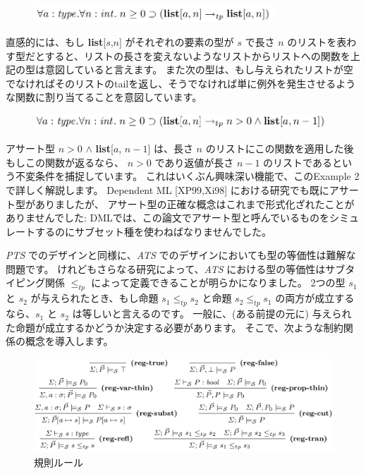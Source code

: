 \documentclass[submit,techreq,noauthor,onecolumn]{ipsj}
\begin{document}
\begin{figure}[h]
\centering
\includegraphics[width=9cm]{img/infig21_example1_list1.png}
\end{figure}

\noindent 直感的には、もし {\bf list}[$s$,$n$] がそれぞれの要素の型が $s$ で長さ $n$ のリストを表わす型だとすると、リストの長さを変えないようなリストからリストへの関数を上記の型は意図していると言えます。
また次の型は、もし与えられたリストが空でなければそのリストのtailを返し、そうでなければ単に例外を発生させるような関数に割り当てることを意図しています。

\begin{figure}[h]
\centering
\includegraphics[width=11cm]{img/infig21_example1_list2.png}
\end{figure}

アサート型 $n > 0$ $\wedge$ {\bf list}[$a$, $n-1$] は、長さ $n$ のリストにこの関数を適用した後もしこの関数が返るなら、 $n > 0$ であり返値が長さ $n-1$ のリストであるという不変条件を捕捉しています。
これはいくぶん興味深い機能で、このExample 2で詳しく解説します。
Dependent ML [XP99,Xi98] における研究でも既にアサート型がありましたが、
アサート型の正確な概念はこれまで形式化ざれたことがありませんでした:
DMLでは、この論文でアサート型と呼んでいるものをシミュレートするのにサブセット種を使わねばなりませんでした。

{\it PTS} でのデザインと同様に、{\it ATS} でのデザインにおいても型の等価性は難解な問題です。
けれどもさらなる研究によって、{\it ATS} における型の等価性はサブタイピング関係 $\leq_{tp}$ によって定義できることが明らかになりました。
2つの型 $s_1$ と $s_2$ が与えられたとき、もし命題 $s_1 \leq_{tp} s_2$ と命題 $s_2 \leq_{tp} s_1$ の両方が成立するなら、$s_1$ と $s_2$ は等しいと言えるのです。
一般に、(ある前提の元に) 与えられた命題が成立するかどうか決定する必要があります。
そこで、次ような制約関係の概念を導入します。

\begin{figure}[h]
\centering
\includegraphics[width=14cm]{img/fig2_regularity_rules.png}
\caption{規則ルール}
\label{fig:fig2_regularity_rules}
\end{figure}
\end{document}
